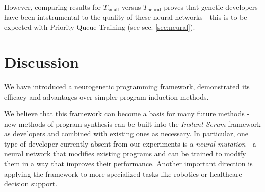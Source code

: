 However, comparing results for $T_\text{small}$ versus $T_\text{neural}$ proves that genetic developers have been intstrumental to the quality of these neural networks - this is to be expected with Priority Queue Training (see sec. \ref{sec:neural}).

\newpage
\section{Discussion}

We have introduced a neurogenetic programming framework, demonstrated its efficacy and advantages over simpler program induction methods.

We believe that this framework can become a basis for many future methods - new methods of program synthesis can be built into the \emph{Instant Scrum} framework as developers and combined with existing ones as necessary.
In particular, one type of developer currently absent from our experiments is a \emph{neural mutation} - a neural network that modifies existing programs and can be trained to modify them in a way that improves their performance.
Another important direction is applying the framework to more specialized tasks like robotics or healthcare decision support. 